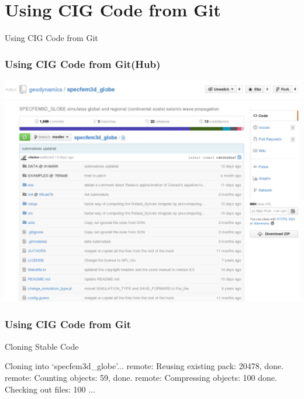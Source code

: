 \section{Using CIG Code from Git}

\begin{frame}
 \vfill
 \begin{center}
  \LARGE \color{solarizedAccent} Using CIG Code from Git
 \end{center}
 \vfill
\end{frame}

\begin{frame}
 \frametitle{Using CIG Code from Git(Hub)}

 \includegraphics[height=\textheight,width=\textwidth,keepaspectratio]{github}
\end{frame}

\begin{frame}[fragile]
 \frametitle{Using CIG Code from Git}

 \begin{exampleblock}{Cloning Stable Code}
  \begin{semiverbatim}
Cloning into `specfem3d_globe'...
remote: Reusing existing pack: 20478, done.
remote: Counting objects: 59, done.
remote: Compressing objects: 100%
done.
Checking out files: 100%
...
\end{semiverbatim}
 \end{exampleblock}
\end{frame}

